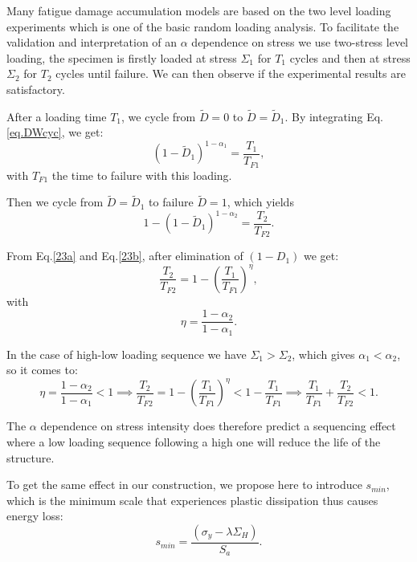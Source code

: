 Many fatigue damage accumulation models are based on the two level loading experiments which is one of the basic random loading analysis. To facilitate the validation and interpretation of an $\alpha$ dependence on stress we use two-stress level loading, the specimen is firstly loaded at stress $\Sigma_1$ for $T_1$ cycles and then at stress $\Sigma_2$ for $T_2$ cycles until failure. We can then observe if the experimental results are satisfactory.

After a loading time $T_1$, we  cycle  from $\tilde{D}=0$ to $\tilde{D}= \tilde{D}_1$. By integrating Eq.\eqref{eq.DWcyc}, we get:
\begin{equation}
\left( 1-\tilde{D}_1\right) ^{1-\alpha_1}=\dfrac{T_1}{T_{F1}},
\label{23a}
\end{equation}
with $T_{F1}$ the time to failure with this loading.

Then we cycle from  ${\tilde D}={\tilde D}_1$ to failure ${\tilde D}=1$, which yields
\begin{equation}
1-\left( 1-\tilde{D}_1\right)^{1-\alpha_2}=\dfrac{T_2}{T_{F2}}.
\label{23b}
\end{equation}

From Eq.\eqref{23a} and Eq.\eqref{23b}, after elimination of $\left( 1-D_1\right)$ we get:
\begin{equation} 
\dfrac{T_2}{T_{F2}} =1-\left( \dfrac{T_1}{T_{F1}}\right) ^\eta,
\end{equation}
with
\begin{equation}
\eta=\dfrac{1-\alpha_2}{1-\alpha_1}.
\label{eq.eta}
\end{equation}

In the case of high-low loading sequence we have $\Sigma_1>\Sigma_2$,  which gives $\alpha_1<\alpha_2$, so it comes to:
$$\eta=\frac{1-\alpha_2}{1-\alpha_1}<1 \implies
\frac{T_2}{T_{F2}}=1-\left( \frac{T_1}{T_{F1}}\right) ^\eta<1-\frac{T_1}{T_{F1}} \implies
\frac{T_1}{T_{F1}}+\frac{T_2}{T_{F2}}<1.$$

The $\alpha$ dependence on stress intensity does therefore predict a sequencing effect where a low loading sequence following a high one will reduce the life of the structure.

To get the same effect in our construction, we propose here to introduce $s_{min}$, which is the minimum scale that experiences plastic dissipation thus causes energy loss:
\begin{equation}
s_{min}=\dfrac{\left(\sigma_y-\lambda \Sigma_H\right)}{S_{a}}.
\label{eq.smin}
\end{equation}


